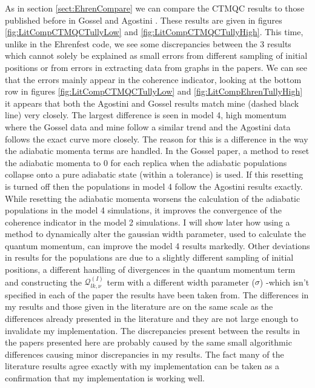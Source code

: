 As in section \ref{sect:EhrenCompare} we can compare the CTMQC results to those published before in Gossel \cite{gossel_coupled-trajectory_2018} and Agostini \cite{agostini_quantum-classical_2016}. These results are given in figures \ref{fig:LitCompCTMQCTullyLow} and \ref{fig:LitCompCTMQCTullyHigh}. This time, unlike in the Ehrenfest code, we see some discrepancies between the 3 results which cannot solely be explained as small errors from different sampling of initial positions or from errors in extracting data from graphs in the papers. We can see that the errors mainly appear in the coherence indicator, looking at the bottom row in figures \ref{fig:LitCompCTMQCTullyLow} and \ref{fig:LitCompEhrenTullyHigh} it appears that both the Agostini and Gossel results match mine (dashed black line) very closely. The largest difference is seen in model 4, high momentum where the Gossel data and mine follow a similar trend and the Agostini data follows the exact curve more closely. The reason for this is a difference in the way the adiabatic momenta terms are handled. In the Gossel paper,  a method to reset the adiabatic momenta to 0 for each replica when the adiabatic populations collapse onto a pure adiabatic state (within a tolerance) is used. If this resetting is turned off then the populations in model 4 follow the Agostini results exactly. While resetting the adiabatic momenta worsens the calculation of the adiabatic populations in the model 4 simulations, it improves the convergence of the coherence indicator in the model 2 simulations. I will show later how using a method to dynamically alter the gaussian width parameter, used to calculate the quantum momentum, can improve the model 4 results markedly. Other deviations in results for the populations are due to a slightly different sampling of initial positions, a different handling of divergences in the quantum momentum term and constructing the $\mathcal{Q}_{lk, \nu}^{(I)}$ term with a different width parameter ($\sigma$) -which isn't specified in each of the paper the results have been taken from. The differences in my results and those given in the literature are on the same scale as the differences already presented in the literature and they are not large enough to invalidate my implementation. The discrepancies present between the results in the papers presented here are probably caused by the same small algorithmic differences causing minor discrepancies in my results. The fact many of the literature results agree exactly with my implementation can be taken as a confirmation that my implementation is working well. 

